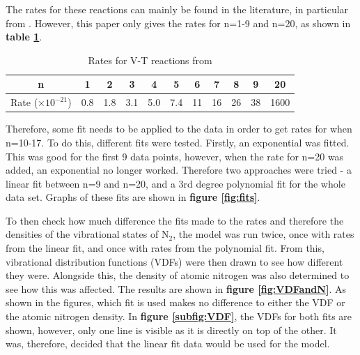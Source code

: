 \documentclass[11pt, oneside]{article}   	%
\begin{document}
The rates for these reactions can mainly be found in the literature, in particular from \cite{Billing1979vv}.
However, this paper only gives the rates for n=1-9 and n=20, as shown in \textbf{table \ref{table:BillingRates}}.

\begin{table}
\begin{center}
\caption{Rates for V-T reactions from \cite{Billing1979vv}}
\begin{tabular}{| c | c | c | c | c | c | c | c | c | c | c |}
\hline
n & 1 & 2 & 3 & 4 & 5 & 6 & 7 & 8 & 9 & 20 \\
\hline
Rate ($ \times 10^{-21}$) &0.8 & 1.8 & 3.1 & 5.0 & 7.4 & 11 & 16 & 26 & 38 & 1600 \\
\hline
\end{tabular}
\label{table:BillingRates}
\end{center}
\end{table}

Therefore, some fit needs to be applied to the data in order to get rates for when n=10-17.
To do this, different fits were tested.
Firstly, an exponential was fitted. 
This was good for the first 9 data points, however, when the rate for n=20 was added, an exponential no longer worked.
Therefore two approaches were tried - a linear fit between n=9 and n=20, and a 3rd degree polynomial fit for the whole data set.
Graphs of these fits are shown in \textbf{figure \ref{fig:fits}}.

To then check how much difference the fits made to the rates and therefore the densities of the vibrational states of N$_2$, the model was run twice, once with rates from the linear fit, and once with rates from the polynomial fit.
From this, vibrational distribution functions (VDFs) were then drawn to see how different they were.
Alongside this, the density of atomic nitrogen was also determined to see how this was affected.
The results are shown in \textbf{figure \ref{fig:VDFandN}}.
As shown in the figures, which fit is used makes no difference to either the VDF or the atomic nitrogen density.
In \textbf{figure \ref{subfig:VDF}}, the VDFs for both fits are shown, however, only one line is visible as it is directly on top of the other.
It was, therefore, decided that the linear fit data would be used for the model.
\end{document}
